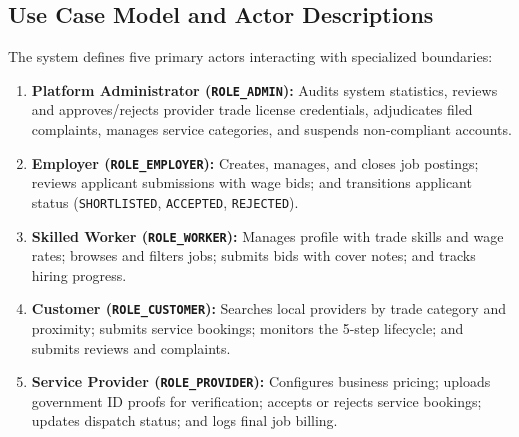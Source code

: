 \subsection{Use Case Model and Actor Descriptions}
The system defines five primary actors interacting with specialized boundaries:
\begin{enumerate}
    \item \textbf{Platform Administrator (\texttt{ROLE\_ADMIN}):} Audits system statistics, reviews and approves/rejects provider trade license credentials, adjudicates filed complaints, manages service categories, and suspends non-compliant accounts.
    \item \textbf{Employer (\texttt{ROLE\_EMPLOYER}):} Creates, manages, and closes job postings; reviews applicant submissions with wage bids; and transitions applicant status (\texttt{SHORTLISTED}, \texttt{ACCEPTED}, \texttt{REJECTED}).
    \item \textbf{Skilled Worker (\texttt{ROLE\_WORKER}):} Manages profile with trade skills and wage rates; browses and filters jobs; submits bids with cover notes; and tracks hiring progress.
    \item \textbf{Customer (\texttt{ROLE\_CUSTOMER}):} Searches local providers by trade category and proximity; submits service bookings; monitors the 5-step lifecycle; and submits reviews and complaints.
    \item \textbf{Service Provider (\texttt{ROLE\_PROVIDER}):} Configures business pricing; uploads government ID proofs for verification; accepts or rejects service bookings; updates dispatch status; and logs final job billing.
\end{enumerate}

